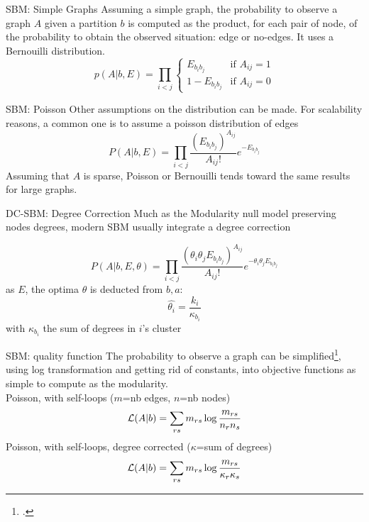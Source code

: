 \begin{textbox}{SBM: Simple Graphs}
    Assuming a simple graph, the probability to observe a graph $A$ given a partition $b$ is computed as the product, for each pair of node, of the probability to obtain the observed situation: edge or no-edges. It uses a Bernouilli distribution.
    \[
        p(A|b,E)=\prod_{i<j}\begin{cases} E_{b_i b_j}    & \text{if } A_{ij}=1 \\
              1- E_{b_i b_j} & \text{if } A_{ij}=0\end{cases}
    \]
\end{textbox}


\begin{textbox}{SBM: Poisson}
    Other assumptions on the distribution can be made. For scalability reasons, a common one is to assume a poisson distribution of edges
    \[
        P(A|b,E)=\prod_{i<j}\frac{(E_{b_ib_j})^{A_{ij}}}{A_{ij}!}e^{-E_{b_ib_j}}
    \]
    Assuming that $A$ is sparse, Poisson or Bernouilli tends toward the same results for large graphs.
\end{textbox}


\begin{textbox}{DC-SBM: Degree Correction}
    Much as the Modularity null model preserving nodes degrees, modern SBM usually integrate a degree correction

    \[
        P(A|b,E,\theta)=\prod_{i<j}\frac{(\theta_i \theta_j E_{b_ib_j})^{A_{ij}}}{A_{ij}!}e^{-\theta_i \theta_j E_{b_ib_j}}
    \]
    as $E$, the optima $\theta$ is deducted from $b,a$:
    \[
        \hat{\theta_i}=\frac{k_i}{\kappa_{b_i}}
    \]
    with $\kappa_{b_i}$ the sum of degrees in $i$'s cluster
\end{textbox}


\begin{textbox}{SBM: quality function}
    The probability to observe a graph can be simplified\footcite{karrer2011stochastic}, using log transformation and getting rid of constants, into objective functions as simple to compute as the modularity.\\
    Poisson, with self-loops ($m$=nb edges, $n$=nb nodes)
    \[
        \mathcal{L}(A|b)=\sum_{rs}m_{rs}\log\frac{m_{rs}}{n_r n_s}{\displaystyle}
    \]
    Poisson, with self-loops, degree corrected ($\kappa$=sum of degrees)
    \[
        \mathcal{L}(A|b)=\sum_{rs}m_{rs}\log\frac{m_{rs}}{\kappa_r \kappa_s}{\displaystyle}
    \]
\end{textbox}


